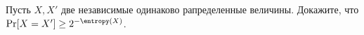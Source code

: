 Пусть $X, X'$ две независимые одинаково рапределенные величины. Докажите, что
$\Pr[X = X'] \ge 2^{-\entropy(X)}$.